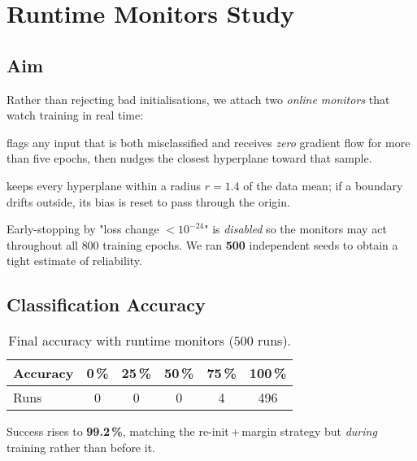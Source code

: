 \section{Runtime Monitors Study}
\label{sec:relu1-monitors}

\subsection*{Aim}
Rather than rejecting bad initialisations, we attach two \emph{online
monitors} that watch training in real time:

\begin{description}[leftmargin=2em,style=sameline]
  \item[DeadSampleMonitor] flags any input that is both misclassified
        and receives \emph{zero} gradient flow for more than five epochs,
        then nudges the closest hyperplane toward that sample.
  \item[BoundsMonitor] keeps every hyperplane within a radius
        $r = 1.4$ of the data mean; if a boundary drifts outside, its
        bias is reset to pass through the origin.
\end{description}

Early-stopping by "loss change $\!\!<\!10^{-24}$" is \emph{disabled}
so the monitors may act throughout all $800$ training epochs.
We ran \textbf{500} independent seeds to obtain a tight estimate of
reliability.

\subsection*{Classification Accuracy}

\begin{table}[ht]
\centering
\caption{Final accuracy with runtime monitors ($500$ runs).}
\label{tab:relu1-monitor-accuracy}
\begin{tabular}{lccccc}
\toprule
Accuracy & 0\,\% & 25\,\% & 50\,\% & 75\,\% & 100\,\% \\
\midrule
Runs & 0 & 0 & 0 & 4 & 496 \\
\bottomrule
\end{tabular}
\end{table}

Success rises to \textbf{99.2\,\%}, matching the re-init\,+\,margin
strategy but \emph{during} training rather than before it.

